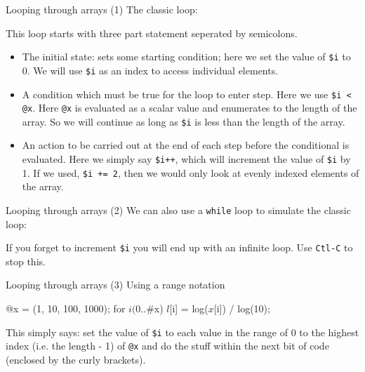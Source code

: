 \documentclass[pdf]{beamer}
\begin{document}
\begin{frame}[fragile]{Looping through arrays (1)}
  The classic loop:
  \small{
  This loop starts with three part statement seperated by semicolons.
  \begin{itemize}
  \item The initial state: sets some starting condition; here we set the value
    of \verb|$i| to 0. We will use \verb|$i| as an index to access individual
    elements.
  \item A condition which must be true for the loop to enter
    step. Here we use \verb|$i < @x|. Here \verb|@x| is evaluated as a scalar
    value and enumerates to the length of the array. So we will continue as
    long as \verb|$i| is less than the length of the array.
  \item An action to be carried out at the end of each step before the
    conditional is evaluated. Here we simply say \verb|$i++|, which will
    increment the value of \verb|$i| by 1. If we used, \verb|$i += 2|, then we
    would only look at evenly indexed elements of the array.
  \end{itemize}
}
\end{frame}

\begin{frame}[fragile]{Looping through arrays (2)}
  We can also use a \texttt{while} loop to simulate the classic loop:
  

  If you forget to increment \verb|$i| you will end up with an infinite
  loop. Use \texttt{Ctl-C} to stop this.
\end{frame}


\begin{frame}[fragile]{Looping through arrays (3)}
  Using a range notation

  \begin{perlcode}
  @x = (1, 10, 100, 1000);
  for $i(0..$#x){
    $l[$i] = log($x[$i]) / log(10);
  }
  \end{perlcode}
  
  This simply says: set the value of \verb|$i| to each value in the range of 0 to the highest index
  (i.e. the length - 1) of \verb|@x| and do the stuff within the next bit of
  code (enclosed by the curly brackets).
\end{frame}
\end{document}
